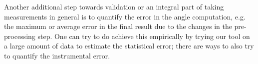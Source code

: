 Another additional step towards validation or an integral part of taking measurements in general %
is to quantify the error in the angle computation, e.g. the maximum or average error in the final result due to the changes in the pre-processing step. %
One can try to do achieve this empirically by trying our tool on a large amount of data to estimate the statistical error; there are ways to also try to quantify the instrumental error. 


%
%
%
%
%
%
%
%
%
%
%
%
%
%
%
%
%
%
%
%
%


